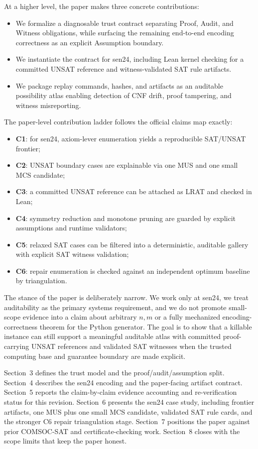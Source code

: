 At a higher level, the paper makes three concrete contributions:
\begin{itemize}[leftmargin=*]
  \item We formalize a diagnosable trust contract separating Proof, Audit, and Witness obligations, while surfacing the remaining end-to-end encoding correctness as an explicit Assumption boundary.
  \item We instantiate the contract for sen24, including Lean kernel checking for a committed UNSAT reference and witness-validated SAT rule artifacts.
  \item We package replay commands, hashes, and artifacts as an auditable possibility atlas enabling detection of CNF drift, proof tampering, and witness misreporting.
\end{itemize}

The paper-level contribution ladder follows the official claims map exactly:
\begin{itemize}[leftmargin=*]
  \item \textbf{C1}: for sen24, axiom-lever enumeration yields a reproducible SAT/UNSAT frontier;
  \item \textbf{C2}: UNSAT boundary cases are explainable via one MUS and one small MCS candidate;
  \item \textbf{C3}: a committed UNSAT reference can be attached as LRAT and checked in Lean;
  \item \textbf{C4}: symmetry reduction and monotone pruning are guarded by explicit assumptions and runtime validators;
  \item \textbf{C5}: relaxed SAT cases can be filtered into a deterministic, auditable gallery with explicit SAT witness validation;
  \item \textbf{C6}: repair enumeration is checked against an independent optimum baseline by triangulation.
\end{itemize}

The stance of the paper is deliberately narrow.
We work only at sen24, we treat auditability as the primary systems requirement, and we do not promote small-scope evidence into a claim about arbitrary $n,m$ or a fully mechanized encoding-correctness theorem for the Python generator.
The goal is to show that a killable instance can still support a meaningful auditable atlas with committed proof-carrying UNSAT references and validated SAT witnesses when the trusted computing base and guarantee boundary are made explicit.

Section~3 defines the trust model and the proof/audit/assumption split.
Section~4 describes the sen24 encoding and the paper-facing artifact contract.
Section~5 reports the claim-by-claim evidence accounting and re-verification status for this revision.
Section~6 presents the sen24 case study, including frontier artifacts, one MUS plus one small MCS candidate, validated SAT rule cards, and the stronger C6 repair triangulation stage.
Section~7 positions the paper against prior COMSOC-SAT and certificate-checking work.
Section~8 closes with the scope limits that keep the paper honest.
